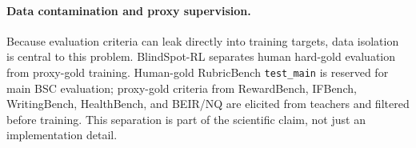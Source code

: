 \paragraph{Data contamination and proxy supervision.}
Because evaluation criteria can leak directly into training targets, data
isolation is central to this problem. BlindSpot-RL separates human hard-gold
evaluation from proxy-gold training. Human-gold RubricBench \texttt{test\_main}
is reserved for main BSC evaluation; proxy-gold criteria from RewardBench,
IFBench, WritingBench, HealthBench, and BEIR/NQ are elicited from teachers and
filtered before training. This separation is part of the scientific claim, not
just an implementation detail.
